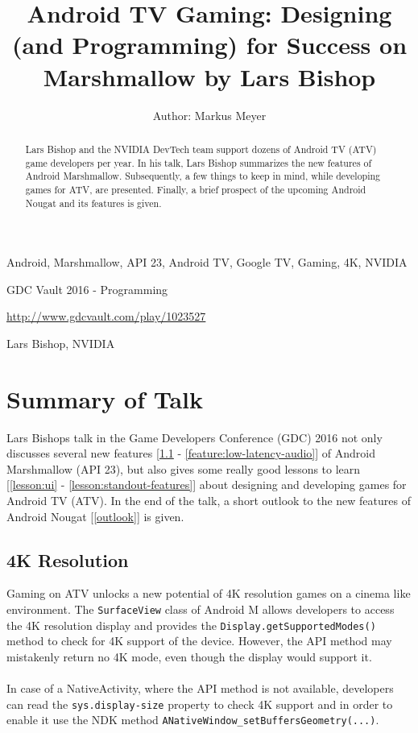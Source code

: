 \documentclass[a4paper]{article}
\title{Android TV Gaming: Designing (and Programming) for Success on Marshmallow by Lars Bishop}
\author{Author: Markus Meyer}
\newcommand{\code}[1]{\colorbox{codegray}{\texttt{#1}}}
\begin{document}
\maketitle

\begin{keywords} Android, Marshmallow, API 23, Android TV, Google TV, Gaming, 4K, NVIDIA \end{keywords}

\begin{track} GDC Vault 2016 - Programming \end{track}

\begin{talkurl} \url{http://www.gdcvault.com/play/1023527} \end{talkurl}

\begin{speaker} Lars Bishop, NVIDIA \end{speaker}

\begin{abstract}
Lars Bishop and the NVIDIA DevTech team support dozens of Android TV (ATV) game developers per year. In his talk, Lars Bishop summarizes the new features of Android Marshmallow. Subsequently, a few things to keep in mind, while developing games for ATV, are presented. Finally, a brief prospect of the upcoming Android Nougat and its features is given.
\end{abstract}

\section{Summary of Talk}
Lars Bishops talk in the Game Developers Conference (GDC) 2016 not only discusses several new features [\ref{feature:4k} - \ref{feature:low-latency-audio}] of Android Marshmallow (API 23), but also gives some really good lessons to learn [\ref{lesson:ui} - \ref{lesson:standout-features}] about designing and developing games for Android TV (ATV). In the end of the talk, a short outlook to the new features of Android Nougat [\ref{outlook}] is given.

\subsection{4K Resolution}
\label{feature:4k}
Gaming on ATV unlocks a new potential of 4K resolution games on a cinema like environment. The \code{SurfaceView} class of Android M allows developers to access the 4K resolution display and provides the \code{Display.getSupportedModes()} method to check for 4K support of the device. However, the API method may mistakenly return no 4K mode, even though the display would support it.\\\\
In case of a NativeActivity, where the API method is not available, developers can read the \code{sys.display-size} property to check 4K support and in order to enable it use the NDK method \code{ANativeWindow\_setBuffersGeometry(...)}.
\end{document}
